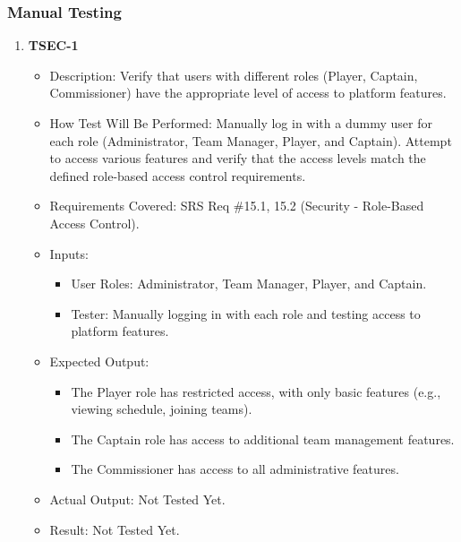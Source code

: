 \documentclass[12pt, titlepage]{article}
\begin{document}
\subsubsection{Manual Testing}
\begin{enumerate}
    \item \textbf{TSEC-1}  
    \begin{itemize}
        \item Description: Verify that users with different roles (Player, Captain, Commissioner) have the appropriate level of access to platform features.
        \item How Test Will Be Performed: Manually log in with a dummy user for each role (Administrator, Team Manager, Player, and Captain). Attempt to access various features and verify that the access levels match the defined role-based access control requirements.
        \item Requirements Covered: SRS Req \#15.1, 15.2 (Security - Role-Based Access Control).
        \item Inputs:  
            \begin{itemize}
                \item User Roles: Administrator, Team Manager, Player, and Captain.
                \item Tester: Manually logging in with each role and testing access to platform features.
            \end{itemize}
        \item Expected Output:  
            \begin{itemize}
                \item The Player role has restricted access, with only basic features (e.g., viewing schedule, joining teams).
                \item The Captain role has access to additional team management features.
                \item The Commissioner has access to all administrative features.
            \end{itemize}
        \item Actual Output: Not Tested Yet.
        \item Result: Not Tested Yet.
    \end{itemize}


\end{enumerate}
\end{document}
